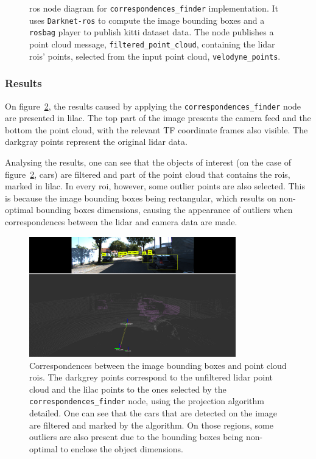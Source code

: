 \begin{figure}[H]
	\centering
	\def\svgwidth{\columnwidth}
	\graphicspath{{img/image-object-to-point-cloud/}}
		
	\caption{\ac{ros} node diagram for \texttt{correspondences\_finder} implementation. It uses \texttt{Darknet-ros} to compute the image bounding boxes and a \texttt{rosbag} player to publish \ac{kitti} dataset data. The node publishes a point cloud message, \texttt{filtered\_point\_cloud}, containing the \ac{lidar} \acp{roi}' points, selected from the input point cloud, \texttt{velodyne\_points}.}
	\label{fig:correspondences-finder-standalone}
\end{figure}

\subsubsection{Results}
On figure~\ref{fig:projected-correspondences}, the results caused by applying the \texttt{correspondences\_finder} node are presented in lilac. The top part of the image presents the camera feed and the bottom the point cloud, with the relevant TF coordinate frames also visible. The  darkgray points represent the original \ac{lidar} data. 

Analysing the results, one can see that the objects of interest (on the case of figure~\ref{fig:projected-correspondences}, cars) are filtered and part of the point cloud that contains the \acp{roi}, marked in lilac. In every \ac{roi}, however, some outlier points are also selected. This is because the image bounding boxes being rectangular, which results on non-optimal bounding boxes dimensions, causing the appearance of outliers when correspondences between the \ac{lidar} and camera data are made.

\begin{figure}[H]
	\centering
	\includegraphics[width=0.8\textwidth]{img/image-object-to-point-cloud/projected_correspondences.png}
	\caption{Correspondences between the image bounding boxes and point cloud \acp{roi}. The darkgrey points correspond to the unfiltered \ac{lidar} point cloud and the lilac points to the ones selected by the \texttt{correspondences\_finder} node, using the projection algorithm detailed. One can see that the cars that are detected on the image are filtered and marked by the algorithm. On those regions, some outliers are also present due to the bounding boxes being non-optimal to enclose the object dimensions.}
	\label{fig:projected-correspondences}
\end{figure}

